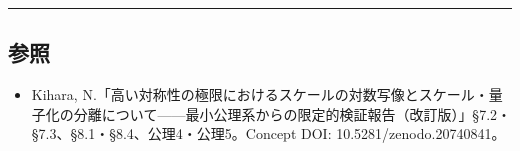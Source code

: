 \documentclass[11pt]{ltjsarticle}
\providecommand{\tightlist}{\setlength{\itemsep}{0pt}\setlength{\parskip}{0pt}}
\begin{document}
\begin{center}\rule{0.5\linewidth}{0.5pt}\end{center}

\subsection{参照}\label{ux53c2ux7167}

\begin{itemize}
\tightlist
\item
  Kihara,
  N.「高い対称性の極限におけるスケールの対数写像とスケール・量子化の分離について------最小公理系からの限定的検証報告（改訂版）」§7.2・§7.3、§8.1・§8.4、公理4・公理5。Concept
  DOI: 10.5281/zenodo.20740841。
\end{itemize}
\end{document}
